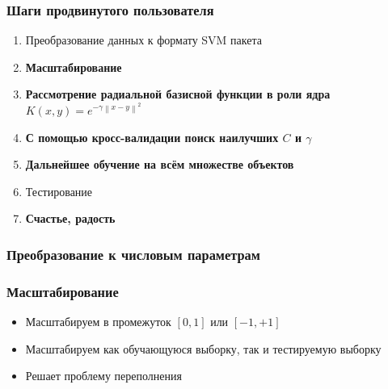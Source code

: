 \begin{frame}
\frametitle{Шаги продвинутого пользователя}
	\begin{enumerate}
		\item Преобразование данных к формату SVM пакета
		\item \textbf{Масштабирование}
		\item \textbf{Рассмотрение радиальной базисной функции в роли ядра $K(x,y)= e^{-\gamma\left \| x - y \right \|^{2}}$}
		\item \textbf{С помощью кросс-валидации поиск наилучших $C$ и $\gamma$}
		\item \textbf{Дальнейшее обучение на всём множестве объектов}
		\item Тестирование
		\item \textbf{Счастье, радость}
	\end{enumerate}
\end{frame}


\begin{frame}
\frametitle{Преобразование к числовым параметрам}
	\begin{figure}[h]
	\end{figure}
\end{frame}


\begin{frame}
\frametitle{Масштабирование}
	\begin{itemize}
		\item Масштабируем в промежуток $[0, 1]$ или $[-1,+1]$
		\item Масштабируем как обучающуюся выборку, так и тестируемую выборку
		\item Решает проблему переполнения
	\end{itemize}
\end{frame}


